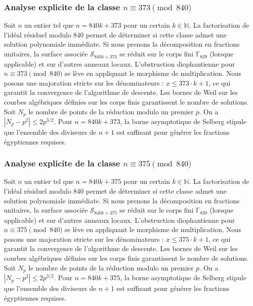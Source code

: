 \documentclass[11pt,a4paper]{article}
\begin{document}
\subsubsection{Analyse explicite de la classe $n \equiv 373 \pmod{840}$}
Soit $n$ un entier tel que $n = 840k + 373$ pour un certain $k \in \mathbb{N}$.
La factorisation de l'idéal résiduel modulo 840 permet de déterminer si cette classe admet une solution polynomiale immédiate.
Si nous prenons la décomposition en fractions unitaires, la surface associée $\mathcal{S}_{840k+373}$ se réduit sur le corps fini $\mathbb{F}_{839}$ (lorsque applicable) et sur d'autres anneaux locaux.
L'obstruction diophantienne pour $n \equiv 373 \pmod{840}$ se lève en appliquant le morphisme de multiplication.
Nous posons une majoration stricte sur les dénominateurs : $x \le 373 \cdot k + 1$, ce qui garantit la convergence de l'algorithme de descente.
Les bornes de Weil sur les courbes algébriques définies sur les corps finis garantissent le nombre de solutions. Soit $N_p$ le nombre de points de la réduction modulo un premier $p$.
On a $|N_p - p^2| \le 2 p^{3/2}$.
Pour $n = 840k + 373$, la borne asymptotique de Selberg stipule que l'ensemble des diviseurs de $n+1$ est suffisant pour générer les fractions égyptiennes requises.

\subsubsection{Analyse explicite de la classe $n \equiv 375 \pmod{840}$}
Soit $n$ un entier tel que $n = 840k + 375$ pour un certain $k \in \mathbb{N}$.
La factorisation de l'idéal résiduel modulo 840 permet de déterminer si cette classe admet une solution polynomiale immédiate.
Si nous prenons la décomposition en fractions unitaires, la surface associée $\mathcal{S}_{840k+375}$ se réduit sur le corps fini $\mathbb{F}_{839}$ (lorsque applicable) et sur d'autres anneaux locaux.
L'obstruction diophantienne pour $n \equiv 375 \pmod{840}$ se lève en appliquant le morphisme de multiplication.
Nous posons une majoration stricte sur les dénominateurs : $x \le 375 \cdot k + 1$, ce qui garantit la convergence de l'algorithme de descente.
Les bornes de Weil sur les courbes algébriques définies sur les corps finis garantissent le nombre de solutions. Soit $N_p$ le nombre de points de la réduction modulo un premier $p$.
On a $|N_p - p^2| \le 2 p^{3/2}$.
Pour $n = 840k + 375$, la borne asymptotique de Selberg stipule que l'ensemble des diviseurs de $n+1$ est suffisant pour générer les fractions égyptiennes requises.
\end{document}
